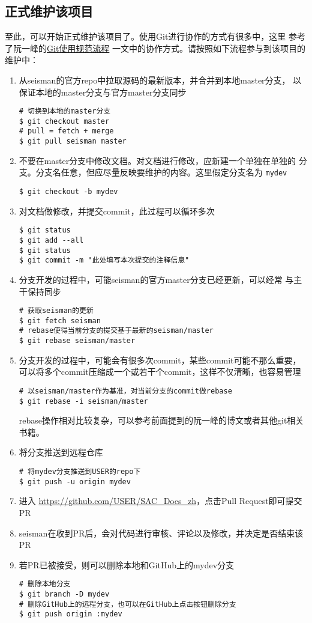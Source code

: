 \subsection{正式维护该项目}
至此，可以开始正式维护该项目了。使用Git进行协作的方式有很多中，这里
参考了阮一峰的\href{http://www.ruanyifeng.com/blog/2015/08/git-use-process.html}{Git使用规范流程}
一文中的协作方式。请按照如下流程参与到该项目的维护中：
\begin{enumerate}
\item 从seisman的官方repo中拉取源码的最新版本，并合并到本地master分支，
    以保证本地的master分支与官方master分支同步
\begin{verbatim}
# 切换到本地的master分支
$ git checkout master
# pull = fetch + merge
$ git pull seisman master
\end{verbatim}
\item 不要在master分支中修改文档。对文档进行修改，应新建一个单独在单独的
    分支。分支名任意，但应尽量反映要维护的内容。这里假定分支名为 \texttt{mydev}
\begin{verbatim}
$ git checkout -b mydev
\end{verbatim}
\item 对文档做修改，并提交commit，此过程可以循环多次
\begin{verbatim}
$ git status
$ git add --all
$ git status
$ git commit -m "此处填写本次提交的注释信息"
\end{verbatim}
\item 分支开发的过程中，可能seisman的官方master分支已经更新，可以经常
    与主干保持同步
\begin{verbatim}
# 获取seisman的更新
$ git fetch seisman
# rebase使得当前分支的提交基于最新的seisman/master
$ git rebase seisman/master
\end{verbatim}
\item 分支开发的过程中，可能会有很多次commit，某些commit可能不那么重要，
    可以将多个commit压缩成一个或若干个commit，这样不仅清晰，也容易管理
\begin{verbatim}
# 以seisman/master作为基准，对当前分支的commit做rebase
$ git rebase -i seisman/master
\end{verbatim}
rebase操作相对比较复杂，可以参考前面提到的阮一峰的博文或者其他git相关书籍。
\item 将分支推送到远程仓库
\begin{verbatim}
# 将mydev分支推送到USER的repo下
$ git push -u origin mydev
\end{verbatim}
\item 进入 \url{https://github.com/USER/SAC_Docs_zh}，点击Pull Request即可提交PR
\item seisman在收到PR后，会对代码进行审核、评论以及修改，并决定是否结束该PR
\item 若PR已被接受，则可以删除本地和GitHub上的mydev分支
\begin{verbatim}
# 删除本地分支
$ git branch -D mydev
# 删除GitHub上的远程分支，也可以在GitHub上点击按钮删除分支
$ git push origin :mydev
\end{verbatim}
\end{enumerate}

